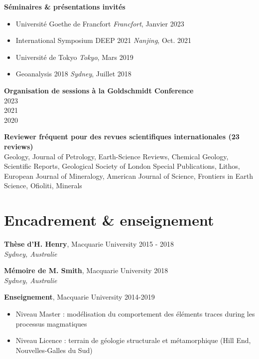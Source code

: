 \documentclass[a4paper,11pt]{article}
\begin{document}
    \textbf{Séminaires \& présentations invités}
    \begin{itemize}[label={},itemsep=0pt,parsep=0pt]
        \item Université Goethe de Francfort
            \hfill \textit{Francfort}, {Janvier 2023}
        \item International Symposium DEEP 2021
            \hfill \textit{Nanjing}, {Oct. 2021}
        \item Université de Tokyo
            \hfill \textit{Tokyo}, {Mars 2019}
        \item Geoanalysis 2018
            \hfill \textit{Sydney}, {Juillet 2018}
    \end{itemize}

    \textbf{Organisation de sessions à la Goldschmidt Conference}\\
     \hfill {2023}\\
     \hfill {2021} \\
     \hfill {2020}
    
    \textbf{Reviewer fréquent pour des revues scientifiques internationales (23 reviews)}\\
      Geology, Journal of Petrology, Earth-Science Reviews, Chemical Geology, Scientific Reports, Geological Society of London Special Publications, Lithos, European Journal of Mineralogy, American Journal of Science, Frontiers in Earth Science, Ofioliti, Minerals

\section{Encadrement \& enseignement}
    \textbf{Thèse d'H. Henry}, Macquarie University
    \hfill {2015 - 2018}\\ 
    \hfill \textit{Sydney, Australie}

    \textbf{Mémoire de M. Smith}, Macquarie University
    \hfill {2018}\\ 
    \hfill \textit{Sydney, Australie}

\textbf{Enseignement}, Macquarie University
\hfill {2014-2019}
    \begin{itemize}[label={},itemsep=0pt,parsep=0pt]
        \item Niveau Master : modélisation du comportement des éléments traces during les processus magmatiques 
        \item Niveau Licence : terrain de géologie structurale et métamorphique (Hill End, Nouvelles-Galles du Sud)
    \end{itemize}
\end{document}
